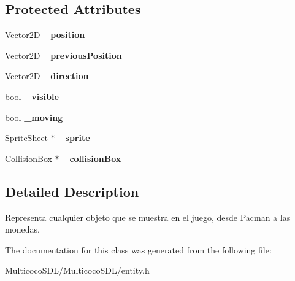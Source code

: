 \subsection*{Protected Attributes}
\begin{DoxyCompactItemize}
\item 
\hypertarget{class_entity_a032fc6b59ce0125aaa590ba45a0e160b}{\hyperlink{class_vector2_d}{Vector2\-D} {\bfseries \-\_\-position}}\label{class_entity_a032fc6b59ce0125aaa590ba45a0e160b}

\item 
\hypertarget{class_entity_ad4c3e1eec02d5d7417a22e6f759fa249}{\hyperlink{class_vector2_d}{Vector2\-D} {\bfseries \-\_\-previous\-Position}}\label{class_entity_ad4c3e1eec02d5d7417a22e6f759fa249}

\item 
\hypertarget{class_entity_a87e3e972e084ed0900466e47fd1c8d99}{\hyperlink{class_vector2_d}{Vector2\-D} {\bfseries \-\_\-direction}}\label{class_entity_a87e3e972e084ed0900466e47fd1c8d99}

\item 
\hypertarget{class_entity_ae227fafdb344eb23c136552b1c57910c}{bool {\bfseries \-\_\-visible}}\label{class_entity_ae227fafdb344eb23c136552b1c57910c}

\item 
\hypertarget{class_entity_a2a1cfc1dc1c719eb49a9b7aa3922b981}{bool {\bfseries \-\_\-moving}}\label{class_entity_a2a1cfc1dc1c719eb49a9b7aa3922b981}

\item 
\hypertarget{class_entity_ac27b197182854d0af144dcbbc54d7151}{\hyperlink{class_sprite_sheet}{Sprite\-Sheet} $\ast$ {\bfseries \-\_\-sprite}}\label{class_entity_ac27b197182854d0af144dcbbc54d7151}

\item 
\hypertarget{class_entity_ad83773979b654d923fca4b83f805368d}{\hyperlink{class_collision_box}{Collision\-Box} $\ast$ {\bfseries \-\_\-collision\-Box}}\label{class_entity_ad83773979b654d923fca4b83f805368d}

\end{DoxyCompactItemize}


\subsection{Detailed Description}
Representa cualquier objeto que se muestra en el juego, desde Pacman a las monedas. 

The documentation for this class was generated from the following file\-:\begin{DoxyCompactItemize}
\item 
Multicoco\-S\-D\-L/\-Multicoco\-S\-D\-L/entity.\-h\end{DoxyCompactItemize}
